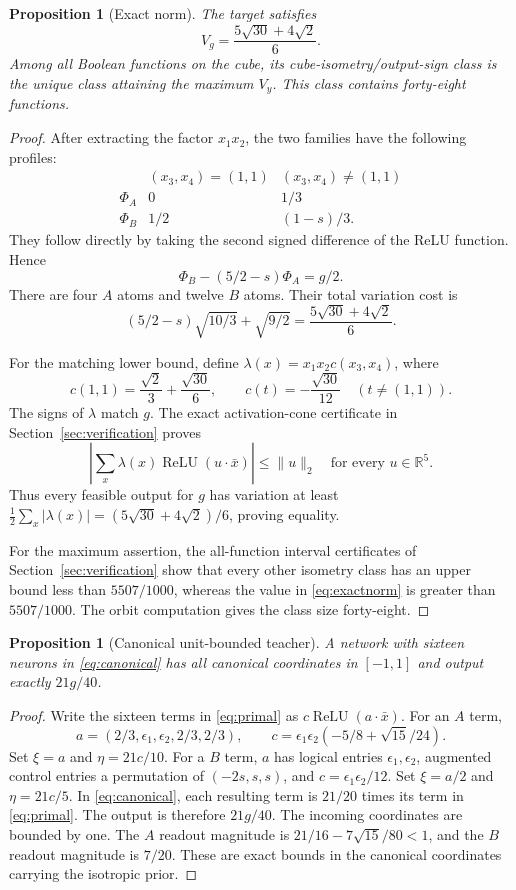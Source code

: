 \documentclass[11pt]{article}
\newtheorem{proposition}[theorem]{Proposition}
\theoremstyle{remark}\newtheorem{remark}[theorem]{Remark}
\newcommand{\relu}{\operatorname{ReLU}}
\newcommand{\R}{\mathbb R}
\newcommand{\1}{\mathbf 1}
\begin{document}
\begin{proposition}[Exact norm]\label{prop:target}
The target satisfies
\[
V_g=\frac{5\sqrt{30}+4\sqrt2}{6}.
\tag{9}\label{eq:exactnorm}
\]
Among all Boolean functions on the cube, its cube-isometry/output-sign class is the unique class attaining the maximum $V_y$. This class contains forty-eight functions.
\end{proposition}
\begin{proof}
After extracting the factor $x_1x_2$, the two families have the following profiles:
\[
\begin{array}{c|cc}
& (x_3,x_4)=(1,1)&(x_3,x_4)\ne(1,1)\\\hline
\Phi_A&0&1/3\\
\Phi_B&1/2&(1-s)/3.
\end{array}
\]
They follow directly by taking the second signed difference of the ReLU function. Hence
\[
\Phi_B-(5/2-s)\Phi_A=g/2.
\tag{10}\label{eq:primal}
\]
There are four $A$ atoms and twelve $B$ atoms. Their total variation cost is
\[
(5/2-s)\sqrt{10/3}+\sqrt{9/2}
=\frac{5\sqrt{30}+4\sqrt2}{6}.
\]

For the matching lower bound, define $\lambda(x)=x_1x_2c(x_3,x_4)$, where
\[
c(1,1)=\frac{\sqrt2}{3}+\frac{\sqrt{30}}6,
\qquad c(t)=-\frac{\sqrt{30}}{12}\quad(t\ne(1,1)).
\tag{11}\label{eq:dual}
\]
The signs of $\lambda$ match $g$. The exact activation-cone certificate in Section~\ref{sec:verification} proves
\[
\left|\sum_x\lambda(x)\relu(u\cdot\bar x)\right|\le\|u\|_2
\quad\text{for every }u\in\R^5.
\tag{12}\label{eq:dualfeasible}
\]
Thus every feasible output for $g$ has variation at least
$\frac12\sum_x|\lambda(x)|=(5\sqrt{30}+4\sqrt2)/6$, proving equality.

For the maximum assertion, the all-function interval certificates of Section~\ref{sec:verification} show that every other isometry class has an upper bound less than $5507/1000$, whereas the value in \eqref{eq:exactnorm} is greater than $5507/1000$. The orbit computation gives the class size forty-eight.
\end{proof}

\begin{proposition}[Canonical unit-bounded teacher]\label{prop:teacher}
A network with sixteen neurons in \eqref{eq:canonical} has all canonical coordinates in $[-1,1]$ and output exactly $21g/40$.
\end{proposition}
\begin{proof}
Write the sixteen terms in \eqref{eq:primal} as $c\relu(a\cdot\bar x)$. For an $A$ term,
\[
a=(2/3,\epsilon_1,\epsilon_2,2/3,2/3),\qquad
c=\epsilon_1\epsilon_2(-5/8+\sqrt{15}/24).
\]
Set $\xi=a$ and $\eta=21c/10$. For a $B$ term, $a$ has logical entries $\epsilon_1,\epsilon_2$, augmented control entries a permutation of $(-2s,s,s)$, and $c=\epsilon_1\epsilon_2/12$. Set $\xi=a/2$ and $\eta=21c/5$.
In \eqref{eq:canonical}, each resulting term is $21/20$ times its term in \eqref{eq:primal}. The output is therefore $21g/40$. The incoming coordinates are bounded by one. The $A$ readout magnitude is $21/16-7\sqrt{15}/80<1$, and the $B$ readout magnitude is $7/20$. These are exact bounds in the canonical coordinates carrying the isotropic prior.
\end{proof}
\end{document}
